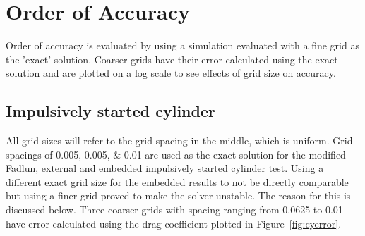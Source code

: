 \section{Order of Accuracy}
Order of accuracy is evaluated by using a simulation evaluated with a fine grid as the 'exact' solution.
Coarser grids have their error calculated using the exact solution and are plotted on a log scale to see effects of grid size on accuracy.

\subsection{Impulsively started cylinder}
All grid sizes will refer to the grid spacing in the middle, which is uniform.
Grid spacings of \numlist{0.005; 0.005; 0.01} are used as the exact solution for the modified Fadlun, external and embedded impulsively started cylinder test. 
Using a different exact grid size for the embedded results to not be directly comparable but using a finer grid proved to make the solver unstable.
The reason for this is discussed below.
Three coarser grids with spacing ranging from 0.0625 to 0.01 have error calculated using the drag coefficient plotted in Figure~\ref{fig:cyerror}.

